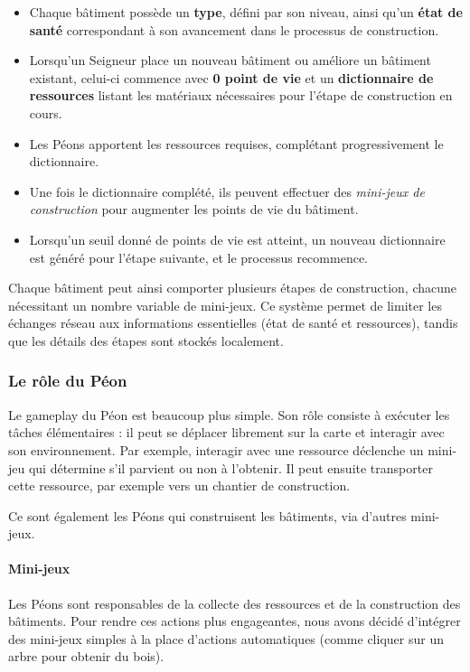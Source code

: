 \begin{itemize}
  \item Chaque bâtiment possède un \textbf{type}, défini par son niveau, ainsi qu’un \textbf{état de santé} correspondant à son avancement dans le processus de construction.
  \item Lorsqu’un Seigneur place un nouveau bâtiment ou améliore un bâtiment existant, celui-ci commence avec \textbf{0 point de vie} et un \textbf{dictionnaire de ressources} listant les matériaux nécessaires pour l’étape de construction en cours.
  \item Les Péons apportent les ressources requises, complétant progressivement le dictionnaire.
  \item Une fois le dictionnaire complété, ils peuvent effectuer des \textit{mini-jeux de construction} pour augmenter les points de vie du bâtiment.
  \item Lorsqu’un seuil donné de points de vie est atteint, un nouveau dictionnaire est généré pour l’étape suivante, et le processus recommence.
\end{itemize}

Chaque bâtiment peut ainsi comporter plusieurs étapes de construction, chacune nécessitant un nombre variable de mini-jeux. Ce système permet de limiter les échanges réseau aux informations essentielles (état de santé et ressources), tandis que les détails des étapes sont stockés localement.

\newpage

\subsubsection{Le rôle du Péon}

Le gameplay du Péon est beaucoup plus simple. Son rôle consiste à exécuter les tâches élémentaires : il peut se déplacer librement sur la carte et interagir avec son environnement. Par exemple, interagir avec une ressource déclenche un mini-jeu qui détermine s’il parvient ou non à l’obtenir. Il peut ensuite transporter cette ressource, par exemple vers un chantier de construction.

Ce sont également les Péons qui construisent les bâtiments, via d'autres mini-jeux.

\paragraph{Mini-jeux}

Les Péons sont responsables de la collecte des ressources et de la construction des bâtiments. Pour rendre ces actions plus engageantes, nous avons décidé d’intégrer des mini-jeux simples à la place d’actions automatiques (comme cliquer sur un arbre pour obtenir du bois).

